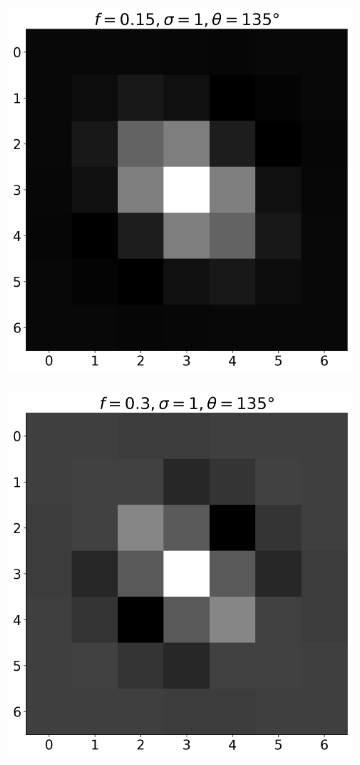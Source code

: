 \documentclass[12pt,a4paper, english]{article}
\begin{document}
\begin{figure}[!htbp]
      \begin{subfigure}[b]{0.3\textwidth}
        \includegraphics[width=\textwidth]{img/K9.png}
      \end{subfigure}
      \begin{subfigure}[b]{0.3\textwidth}
        \includegraphics[width=\textwidth]{img/K10.png}

\end{subfigure}
\end{figure}
\end{document}

